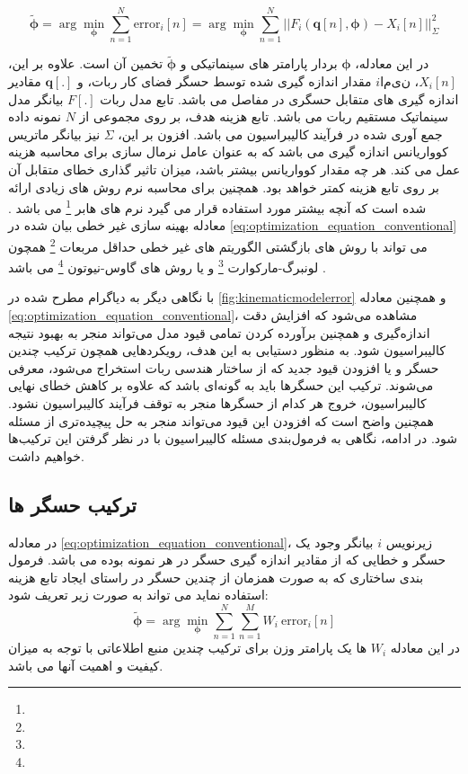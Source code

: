 \begin{equation}\label{eq:optimization_equation_conventional}
	\tilde{\boldsymbol{\phi}} =  \arg\min_{\boldsymbol{\phi}} \sum_{n = 1 }^{N} \text{error}_i[n] = \arg\min_{\boldsymbol{\phi}} \sum_{n = 1}^{N} ||F_i(\boldsymbol{q}[n], \boldsymbol{\phi}) - X_i[n]||^2_{\Sigma}
\end{equation}

در این معادله، $\boldsymbol{\phi}$ بردار پارامتر های سینماتیکی و $\tilde{\boldsymbol{\phi}}$ تخمین آن است. علاوه بر این، $X_i[n]$، 
$iامین$
مقدار اندازه گیری شده توسط حسگر فضای کار ربات، و $\boldsymbol{q}[.]$ مقادیر اندازه گیری های متقابل حسگری در مفاصل می باشد. تابع مدل ربات $F[.]$ بیانگر مدل سینماتیک مستقیم ربات می باشد. تابع هزینه هدف، بر روی مجموعی از $N$ نمونه داده جمع آوری شده در فرآیند کالیبراسیون می باشد. افزون بر این، $\Sigma$ نیز بیانگر ماتریس کوواریانس اندازه گیری می باشد که به عنوان عامل نرمال سازی برای محاسبه هزینه عمل می کند. هر چه مقدار کوواریانس بیشتر باشد، میزان تاثیر گذاری خطای متقابل آن بر روی تابع هزینه کمتر خواهد بود. همچنین برای محاسبه نرم روش های زیادی ارائه شده است که آنچه بیشتر مورد استفاده قرار می گیرد نرم های هابر 
\footnote{}
می باشد
\cite{chang2015huber}.
معادله بهینه سازی غیر خطی بیان شده در 
\ref{eq:optimization_equation_conventional}
می تواند با روش های بازگشتی الگوریتم های غیر خطی حداقل مربعات
\footnote{}
همچون  لونبرگ-مارکوارت
\footnote{}
و یا روش های گاوس-نیوتون
\footnote{}
می باشد
\cite{dellart_robot_perception}.

با نگاهی دیگر به دیاگرام مطرح شده در 
\ref{fig:kinematicmodelerror}
و همچنین معادله 
\ref{eq:optimization_equation_conventional}،
مشاهده می‌شود که افزایش دقت اندازه‌گیری و همچنین برآورده کردن تمامی قیود مدل می‌تواند منجر به بهبود نتیجه کالیبراسیون شود. به منظور دستیابی به این هدف، رویکردهایی همچون ترکیب چندین حسگر و یا افزودن قیود جدید که از ساختار هندسی ربات استخراج می‌شود، معرفی می‌شوند. ترکیب این حسگرها باید به گونه‌ای باشد که علاوه بر کاهش خطای نهایی کالیبراسیون، خروج هر کدام از حسگرها منجر به توقف فرآیند کالیبراسیون نشود. همچنین واضح است که افزودن این قیود می‌تواند منجر به حل پیچیده‌تری از مسئله شود. در ادامه، نگاهی به فرمول‌بندی مسئله کالیبراسیون با در نظر گرفتن این ترکیب‌ها خواهیم داشت.

\subsection{ترکیب حسگر ها}
در معادله 
\ref{eq:optimization_equation_conventional}،
زیرنویس 
$i$
بیانگر وجود یک حسگر و خطایی که از مقادیر اندازه گیری حسگر در هر نمونه بوده می باشد. فرمول بندی ساختاری که به صورت همزمان از چندین حسگر در راستای ایجاد تابع هزینه استفاده نماید می تواند به صورت زیر تعریف شود:
\begin{equation}\label{eq:optimization_equation_conventional_multi_sensor}
	\tilde{\boldsymbol{\phi}} =  \arg\min_{\boldsymbol{\phi}} \sum_{n = 1 }^{N} \sum_{n = 1 }^{M} W_i~\text{error}_i[n] 
\end{equation}
در این معادله 
$W_i$
ها یک پارامتر وزن برای ترکیب چندین منبع اطلاعاتی با توجه به میزان کیفیت و اهمیت آنها می باشد.


